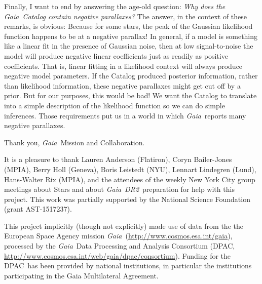 \documentclass[12pt, modern]{aastex62h}
\newcommand{\acronym}[1]{{\small{#1}}}
\newcommand{\Gaia}{\textsl{Gaia}}
\newcommand{\DRtwo}{\textsl{\acronym{DR2}}}
\newcommand{\DPAC}{{\acronym{DPAC}}}
\begin{document}
Finally, I want to end by answering the age-old question:
\emph{Why does the \Gaia\ Catalog contain negative parallaxes?}
The answer, in the context of these remarks, is obvious:
Because for some stars, the peak of the Gaussian likelihood function happens
to be at a negative parallax!
In general, if a model is something like a linear fit in the presence of Gaussian
noise, then
at low signal-to-noise the model will produce negative linear coefficients just as
readily as positive coefficients.
That is, linear fitting in a likelihood context will always produce negative
model parameters.
If the Catalog produced posterior information, rather than likelihood information,
these negative parallaxes might get cut off by a prior.
But for our purposes, this would be bad!
We want the Catalog to translate into a simple description
of the likelihood function so we can do simple inferences.
Those requirements put us in a world in which \Gaia\ reports many
negative parallaxes.

Thank you, \Gaia\ Mission and Collaboration.

\acknowledgements
It is a pleasure to thank
  Lauren Anderson (Flatiron),
  Coryn Bailer-Jones (\acronym{MPIA}),
  Berry Holl (Geneva),
  Boris Leistedt (\acronym{NYU}),
  Lennart Lindegren (Lund),
  Hans-Walter Rix (\acronym{MPIA}),
and the attendees of the
  weekly New York City group meetings about Stars and about \Gaia\ \DRtwo\ preparation
for help with this project.
This work was partially supported by
  the National Science Foundation (grant \acronym{AST-1517237}).

This project implicitly (though not explicitly) made use of data from the
the European Space Agency
mission \Gaia\ (\url{http://www.cosmos.esa.int/gaia}), processed by the
\Gaia\ Data Processing and Analysis Consortium (\DPAC,
\url{http://www.cosmos.esa.int/web/gaia/dpac/consortium}). Funding for the
\DPAC\ has been provided by national institutions, in particular the
institutions participating in the Gaia Multilateral Agreement.


\end{document}
